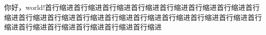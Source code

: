 \documentclass[UTF8]{ctexart}
\begin{document}
你好，world!首行缩进首行缩进首行缩进首行缩进首行缩进首行缩进首行缩进首行缩进首行缩进首行缩进首行缩进首行缩进首行缩进首行缩进首行缩进首行缩进首行缩进首行缩进首行缩进首行缩进首行缩进首行缩进
\end{document}
